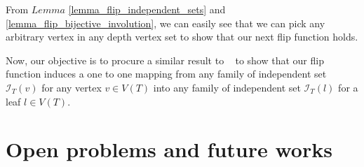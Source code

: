 \documentclass{amsart}
\theoremstyle{definition}
\begin{document}
From $Lemma$ \ref{lemma_flip_independent_sets} and \ref{lemma_flip_bijective_involution}, we can easily see that we can pick any arbitrary vertex in any depth vertex set to show that our next flip function holds.

Now, our objective is to procure a similar result to ~\cite{MR4245360} to show that our flip function induces a one to one mapping from any family of independent set $\mathcal{I}_{T}(v)$ for any vertex $v \in V(T)$ into any family of independent set $\mathcal{I}_{T}(l)$ for a leaf $l \in V(T)$.

\section{Open problems and future works}\label{future}





\end{document}
